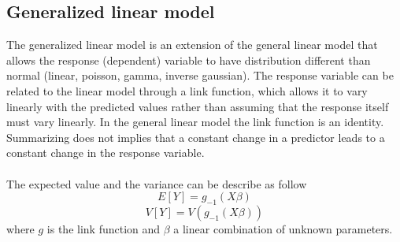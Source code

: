 \subsection{Generalized linear model}
The generalized linear model is an extension of the general linear model that allows the response (dependent) variable  to have distribution different than normal (linear, poisson, gamma, inverse gaussian). The response variable can be related to the linear model through a link function, which allows it to vary linearly with the predicted values rather than assuming that the response itself must vary linearly. In the general linear model the link function is an identity.
Summarizing does not implies that a constant change in a predictor leads to a constant change in the response variable.
\\\\
The expected value and the variance can be describe as follow
\begin{equation}
	E[Y] = g_{-1}(X \beta)
\end{equation}
\begin{equation}
	V[Y] = V(g_{-1}(X \beta))
\end{equation}
where $g$ is the link function and $\beta$  a linear combination of unknown parameters.